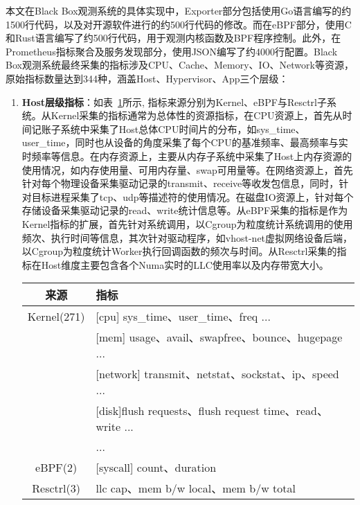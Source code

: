 
本文在Black Box观测系统的具体实现中，Exporter部分包括使用Go语言编写的约1500行代码，以及对开源软件进行的约500行代码的修改。而在eBPF部分，使用C和Rust语言编写了约500行代码，用于观测内核函数及BPF程序控制。此外，在Prometheus指标聚合及服务发现部分，使用JSON编写了约4000行配置。Black Box观测系统最终采集的指标涉及CPU、Cache、Memory、IO、Network等资源，原始指标数量达到344种，涵盖Host、Hypervisor、App三个层级：

\begin{enumerate}
    \item \textbf{Host层级指标}：如表~\ref{tab:host_metric}所示, 指标来源分别为Kernel、eBPF与Resctrl子系统。从Kernel采集的指标通常为总体性的资源指标，在CPU资源上，首先从时间记账子系统中采集了Host总体CPU时间片的分布，如sys\_time、user\_time，同时也从设备的角度采集了每个CPU的基准频率、最高频率与实时频率等信息。在内存资源上，主要从内存子系统中采集了Host上内存资源的使用情况，如内存使用量、可用内存量、swap可用量等。在网络资源上，首先针对每个物理设备采集驱动记录的transmit、receive等收发包信息，同时，针对目标进程采集了tcp、udp等描述符的使用情况。在磁盘IO资源上，针对每个存储设备采集驱动记录的read、write统计信息等。从eBPF采集的指标是作为Kernel指标的扩展，首先针对系统调用，以Cgroup为粒度统计系统调用的使用频次、执行时间等信息，其次针对驱动程序，如vhost-net虚拟网络设备后端，以Cgroup为粒度统计Worker执行回调函数的频次与时间。从Resctrl采集的指标在Host维度主要包含各个Numa实时的LLC使用率以及内存带宽大小。

\begin{table}[!htbp]
    \label{tab:host_metric}
    \footnotesize%
    \setlength{\tabcolsep}{4pt}%
    \renewcommand{\arraystretch}{1.25}%
    \centering
    \begin{tabular}{cl}
        \hline
        来源 & 指标\\
        \hline
        Kernel(271) & [cpu] sys\_time、user\_time、freq ... \\
        & [mem] usage、avail、swapfree、bounce、hugepage ...\\
        & [network] transmit、netstat、sockstat、ip、speed ...\\
        & [disk]flush requests、flush request time、read、write ...\\
        & ...\\
        eBPF(2) & [syscall] count、duration\\
        Resctrl(3) & llc cap、mem b/w local、mem b/w total\\
        \hline
    \end{tabular}
\end{table}


\end{enumerate}
